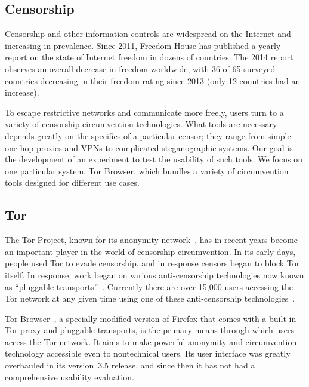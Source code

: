 \documentclass[letterpaper,twocolumn,11pt]{article}
\begin{document}
\subsection{Censorship} %

\indent \indent Censorship and other information controls
are widespread on the Internet and increasing in prevalence.
Since 2011, Freedom House has published a yearly report
on the state of Internet freedom in dozens of countries.
The 2014 report~\cite{freedom-on-the-net-2014} observes
an overall decrease in freedom worldwide,
with 36 of 65 surveyed countries decreasing in their freedom rating
since 2013 (only 12 countries had an increase).

To escape restrictive networks and communicate more freely,
users turn to a variety of censorship circumvention technologies.
What tools are necessary depends greatly on the specifics of
a particular censor;
they range from simple one-hop proxies and VPNs
to complicated steganographic systems.
Our goal is the development of an experiment
to test the usability of such tools.
We focus on one particular system,
Tor Browser, which bundles a variety of circumvention
tools designed for different use cases.

\subsection{Tor} 

\indent \indent The Tor Project, known for its anonymity network~\cite{tor-design},
has in recent years become an important player in the world of
censorship circumvention.
In its early days, people used Tor to evade censorship,
and in response censors began to block Tor itself.
In response, work began on various anti-censorship technologies
now known as ``pluggable transports''~\cite{pluggable-transports}.
Currently there are over 15,000 users accessing the Tor network
at any given time using one of these
anti-censorship technologies~\cite{userstats-bridge-country}.

Tor Browser~\cite{tor-browser},
a specially modified version of Firefox that comes
with a built-in Tor proxy and pluggable transports,
is the primary means through which users access the Tor network.
It aims to make powerful anonymity and circumvention technology
accessible even to nontechnical users.
Its user interface was greatly overhauled in its version~3.5 release,
and since then it has not had a comprehensive usability evaluation.
\end{document}
